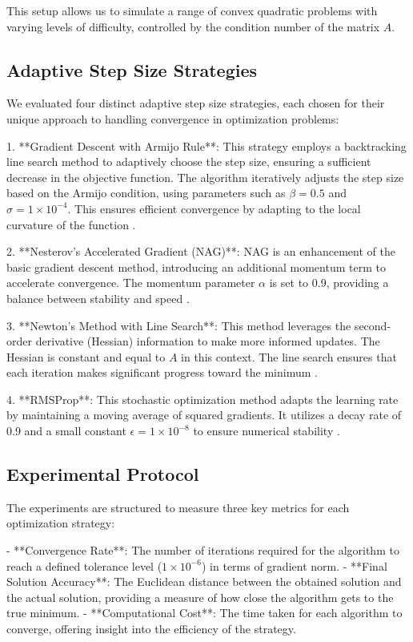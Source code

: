 \documentclass[11pt]{article}
\begin{document}
This setup allows us to simulate a range of convex quadratic problems with varying levels of difficulty, controlled by the condition number of the matrix \( A \).

\subsection{Adaptive Step Size Strategies}

We evaluated four distinct adaptive step size strategies, each chosen for their unique approach to handling convergence in optimization problems:

1. **Gradient Descent with Armijo Rule**: This strategy employs a backtracking line search method to adaptively choose the step size, ensuring a sufficient decrease in the objective function. The algorithm iteratively adjusts the step size based on the Armijo condition, using parameters such as \( \beta = 0.5 \) and \( \sigma = 1 \times 10^{-4} \). This ensures efficient convergence by adapting to the local curvature of the function .

2. **Nesterov's Accelerated Gradient (NAG)**: NAG is an enhancement of the basic gradient descent method, introducing an additional momentum term to accelerate convergence. The momentum parameter \( \alpha \) is set to 0.9, providing a balance between stability and speed \cite{Beck2009AFI}.

3. **Newton's Method with Line Search**: This method leverages the second-order derivative (Hessian) information to make more informed updates. The Hessian is constant and equal to \( A \) in this context. The line search ensures that each iteration makes significant progress toward the minimum \cite{Pei2014ATA}.

4. **RMSProp**: This stochastic optimization method adapts the learning rate by maintaining a moving average of squared gradients. It utilizes a decay rate of 0.9 and a small constant \( \epsilon = 1 \times 10^{-8} \) to ensure numerical stability .

\subsection{Experimental Protocol}

The experiments are structured to measure three key metrics for each optimization strategy:

- **Convergence Rate**: The number of iterations required for the algorithm to reach a defined tolerance level (\( 1 \times 10^{-6} \)) in terms of gradient norm.
- **Final Solution Accuracy**: The Euclidean distance between the obtained solution and the actual solution, providing a measure of how close the algorithm gets to the true minimum.
- **Computational Cost**: The time taken for each algorithm to converge, offering insight into the efficiency of the strategy.
\end{document}
